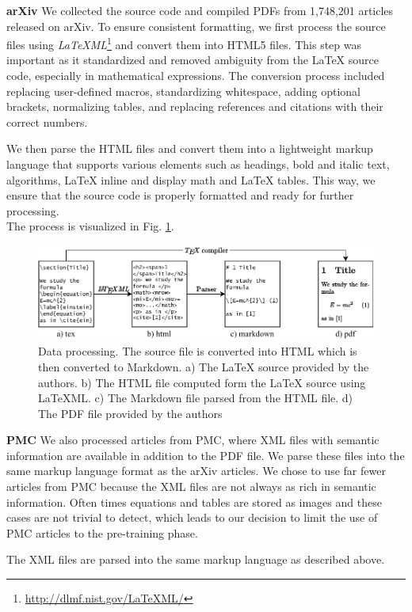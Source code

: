\documentclass[]{article}
\newcommand{\para}[1]{\textbf{#1} \quad}
\begin{document}
\para{arXiv} We collected the source code and compiled PDFs from 1,748,201 articles released on arXiv. To ensure consistent formatting, we first process the %
source files using \emph{LaTeXML}\footnote{\url{http://dlmf.nist.gov/LaTeXML/}} and convert them into HTML5 files. %
This step was important as it standardized and removed ambiguity from the LaTeX source code, especially in mathematical expressions. The conversion process included replacing user-defined macros, standardizing whitespace, adding optional brackets, normalizing tables, and replacing references and citations with their correct numbers.

We then parse the HTML files and convert them into a lightweight markup language that supports various elements such as headings, bold and italic text, algorithms, LaTeX inline and display math and LaTeX tables. This way, we ensure that the source code is properly formatted and ready for further processing.\\
The process is visualized in Fig. \ref{fig:dataformat}.
\begin{figure}
    \centering
    \includegraphics[width=.95\textwidth]{figures/dataformat.pdf}
    \caption{Data processing. The source file is converted into HTML which is then converted to Markdown. a) The LaTeX source provided by the authors. b) The HTML file computed form the LaTeX source using LaTeXML. c) The Markdown file parsed from the HTML file. d) The PDF file provided by the authors}
    \label{fig:dataformat}
\end{figure}

\para{PMC} We also processed articles from PMC, where XML files with semantic information are available in addition to the PDF file. We parse these files into the same markup language format as the arXiv articles. We chose to use far fewer articles from PMC because the XML files are not always as rich in semantic information. Often times equations and tables are stored as images and these cases are not trivial to detect, which leads to our decision to limit the use of PMC articles to the pre-training phase.

The XML files are parsed into the same markup language as described above.
\end{document}

